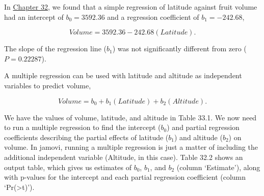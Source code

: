 \documentclass[
  openany]{krantz}
\begin{document}
In \protect\hyperlink{Chapter_32}{Chapter 32}, we found that a simple regression of latitude against fruit volume had an intercept of \(b_{0} = 3592.36\) and a regression coefficient of \(b_{1} = -242.68\),

\[Volume = 3592.36 - 242.68(Latitude).\]

The slope of the regression line (\(b_{1}\)) was not significantly different from zero (\(P = 0.22287\)).

A multiple regression can be used with latitude and altitude as independent variables to predict volume,

\[Volume = b_{0} + b_{1}(Latitude) + b_{2}(Altitude).\]

We have the values of volume, latitude, and altitude in Table 33.1.
We now need to run a multiple regression to find the intercept (\(b_{0}\)) and partial regression coefficients describing the partial effects of latitude (\(b_{1}\)) and altitude (\(b_{2}\)) on volume.
In jamovi, running a multiple regression is just a matter of including the additional independent variable (Altitude, in this case).
Table 32.2 shows an output table, which gives us estimates of \(b_{0}\), \(b_{1}\), and \(b_{2}\) (column `Estimate'), along with p-values for the intercept and each partial regression coefficient (column `Pr(\textgreater\textbar t\textbar)').
\end{document}
